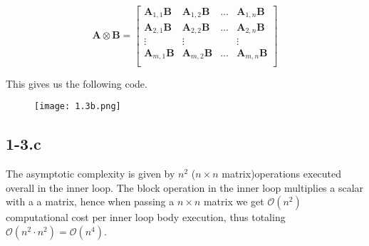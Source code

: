 \documentclass{article}
\begin{document}
\begin{equation*}
    \mathbf{A} \otimes \mathbf{B} = \begin{bmatrix}
        \mathbf{A}_{1,1}\mathbf{B} & \mathbf{A}_{1,2}\mathbf{B} & \dots & \mathbf{A}_{1,n}\mathbf{B} \\
        \mathbf{A}_{2,1}\mathbf{B} & \mathbf{A}_{2,2}\mathbf{B} & \dots & \mathbf{A}_{2,n}\mathbf{B} \\
        \vdots & \vdots & & \vdots \\
        \mathbf{A}_{m,1}\mathbf{B} & \mathbf{A}_{m,2}\mathbf{B} & \dots &\mathbf{A}_{m,n}\mathbf{B} \\
    \end{bmatrix}
\end{equation*}

\pagebreak

This gives us the following code.
\begin{figure}[!hbt]
    \centering
\texttt{[image: 1.3b.png]}
\end{figure}
\subsection*{1-3.c} The asymptotic complexity is given by $n^{2}$ ($n \times n$ matrix)operations executed overall in the inner loop. The block operation in the inner loop multiplies a scalar with a a matrix, hence when passing a $n \times n$ matrix we get $\mathcal{O}\left(n^{2}\right)$ computational cost per inner loop body execution, thus totaling $\mathcal{O}\left(n^{2}\cdot n^{2}\right) = \mathcal{O}\left(n^{4}\right)$.
\end{document}
